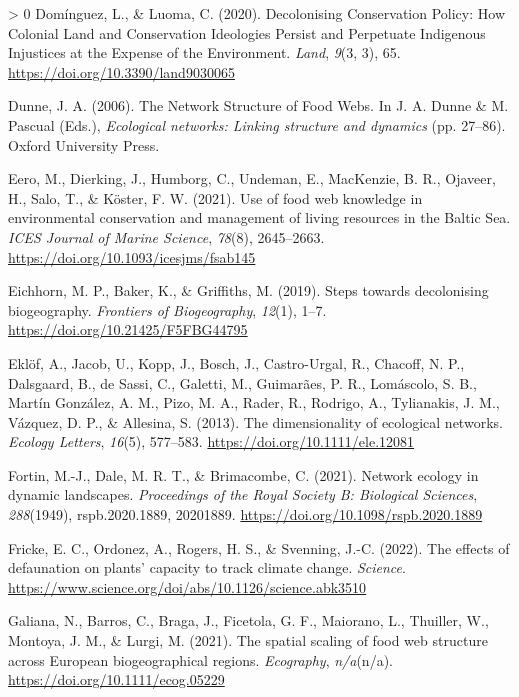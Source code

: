 \documentclass[11pt]{article}
\newlength{\cslhangindent}
\newenvironment{CSLReferences}[3] %
 {%
  \setlength{\parindent}{0pt}
  \ifodd #1 \everypar{\setlength{\hangindent}{\cslhangindent}}\ignorespaces\fi
  \ifnum #2 > 0
  \setlength{\parskip}{#2\baselineskip}
  \fi
 }%
 {}
\begin{document}
\begin{CSLReferences}{1}{0}
\leavevmode\hypertarget{ref-Dominguez2020DecCon}{}%
Domínguez, L., \& Luoma, C. (2020). Decolonising Conservation Policy:
How Colonial Land and Conservation Ideologies Persist and Perpetuate
Indigenous Injustices at the Expense of the Environment. \emph{Land},
\emph{9}(3, 3), 65. \url{https://doi.org/10.3390/land9030065}

\leavevmode\hypertarget{ref-Dunne2006NetStr}{}%
Dunne, J. A. (2006). The Network Structure of Food Webs. In J. A. Dunne
\& M. Pascual (Eds.), \emph{Ecological networks: Linking structure and
dynamics} (pp. 27--86). Oxford University Press.

\leavevmode\hypertarget{ref-Eero2021UseFoo}{}%
Eero, M., Dierking, J., Humborg, C., Undeman, E., MacKenzie, B. R.,
Ojaveer, H., Salo, T., \& Köster, F. W. (2021). Use of food web
knowledge in environmental conservation and management of living
resources in the Baltic Sea. \emph{ICES Journal of Marine Science},
\emph{78}(8), 2645--2663. \url{https://doi.org/10.1093/icesjms/fsab145}

\leavevmode\hypertarget{ref-Eichhorn2019SteDec}{}%
Eichhorn, M. P., Baker, K., \& Griffiths, M. (2019). Steps towards
decolonising biogeography. \emph{Frontiers of Biogeography},
\emph{12}(1), 1--7. \url{https://doi.org/10.21425/F5FBG44795}

\leavevmode\hypertarget{ref-Eklof2013DimEco}{}%
Eklöf, A., Jacob, U., Kopp, J., Bosch, J., Castro-Urgal, R., Chacoff, N.
P., Dalsgaard, B., de Sassi, C., Galetti, M., Guimarães, P. R.,
Lomáscolo, S. B., Martín González, A. M., Pizo, M. A., Rader, R.,
Rodrigo, A., Tylianakis, J. M., Vázquez, D. P., \& Allesina, S. (2013).
The dimensionality of ecological networks. \emph{Ecology Letters},
\emph{16}(5), 577--583. \url{https://doi.org/10.1111/ele.12081}

\leavevmode\hypertarget{ref-Fortin2021NetEco}{}%
Fortin, M.-J., Dale, M. R. T., \& Brimacombe, C. (2021). Network ecology
in dynamic landscapes. \emph{Proceedings of the Royal Society B:
Biological Sciences}, \emph{288}(1949), rspb.2020.1889, 20201889.
\url{https://doi.org/10.1098/rspb.2020.1889}

\leavevmode\hypertarget{ref-Fricke2022EffDef}{}%
Fricke, E. C., Ordonez, A., Rogers, H. S., \& Svenning, J.-C. (2022).
The effects of defaunation on plants' capacity to track climate change.
\emph{Science}.
\url{https://www.science.org/doi/abs/10.1126/science.abk3510}

\leavevmode\hypertarget{ref-Galiana2021SpaSca}{}%
Galiana, N., Barros, C., Braga, J., Ficetola, G. F., Maiorano, L.,
Thuiller, W., Montoya, J. M., \& Lurgi, M. (2021). The spatial scaling
of food web structure across European biogeographical regions.
\emph{Ecography}, \emph{n/a}(n/a).
\url{https://doi.org/10.1111/ecog.05229}


\end{CSLReferences}
\end{document}
